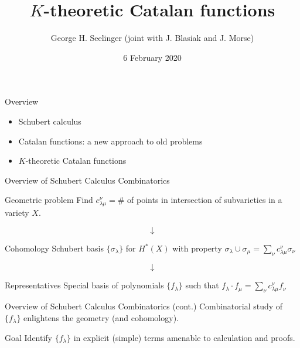 \documentclass{beamer}
\title[\(K\)-theory Catalans]{\(K\)-theoretic Catalan functions} %
\author[George H. Seelinger]{George H. Seelinger (joint with
  J. Blasiak and J. Morse)} %
\institute[UVA] %
{
CAGE \\ %
\medskip
\textit{ghs9ae@virginia.edu} %
}
\date{6 February 2020} %
\DeclareMathOperator{\Gr}{Gr}
\newcommand{\cupprod}{\cup}
\begin{document}
\begin{frame}
\titlepage %
\end{frame}
\begin{frame}{Overview}
  \begin{itemize}
  \item Schubert calculus
  \item Catalan functions: a new approach to old problems
  \item \(K\)-theoretic Catalan functions
  \end{itemize}
\end{frame}
\begin{frame}{Overview of Schubert Calculus Combinatorics}
  \begin{block}{Geometric problem}
    Find \(c_{\lambda \mu}^\nu = \#\) of points in
    intersection of subvarieties in a variety \(X\). \pause
  \end{block}
  \[
    \downarrow
  \]
  \begin{block}{Cohomology}
    Schubert basis \(\{\sigma_\lambda\}\) for \(H^*(X)\) with property \(\sigma_\lambda \cupprod \sigma_\mu = \sum_\nu c_{\lambda \mu}^\nu \sigma_\nu\) \pause 
\end{block}
\[
  \downarrow
\]
\begin{block}{Representatives}
  Special basis of polynomials \(\{f_\lambda\}\) such that \(f_\lambda \cdot f_\mu = \sum_\nu c_{\lambda \mu}^\nu f_\nu\)
\end{block}
\end{frame}
\begin{frame}{Overview of Schubert Calculus Combinatorics (cont.)}
  Combinatorial study of \(\{f_\lambda\}\) enlightens the geometry
  (and cohomology). %
  \begin{alertblock}{Goal}
    Identify \(\{f_\lambda\}\) in explicit (simple) terms amenable to
    calculation and proofs.
  \end{alertblock}
\end{frame}
\end{document}
